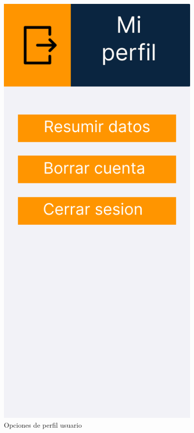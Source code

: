 \begin{figure}[H]
   \centering
   \begin{minipage}{0.45\textwidth}
      \centering
      \includegraphics[width=0.9\textwidth]{fotos/Frame 36.png}
      \caption{Opciones de perfil usuario}

\end{minipage}
\end{figure}
